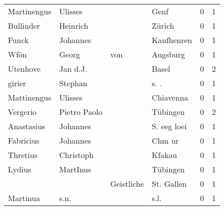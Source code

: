\begin{center}
\begin{tiny}
\begin{longtabu}{llllrr}
              Martinengus &                            Ulisses &             &                                        Genf &          0 &         1 \\
                Bullinder &                           Heinrich &             &                                      Zürich &          0 &         1 \\
                    Funck &                           Johannes &             &                                  Kaufhenren &          0 &         1 \\
                     Wfön &                              Georg &         von &                                    Augsburg &          0 &         1 \\
                 Utenhove &                           Jan d.J. &             &                                       Basel &          0 &         2 \\
                   girier &                            Stephan &             &                                       s. .  &          0 &         1 \\
              Mattinengus &                            Ulisses &             &                                   Chiavenna &          0 &         1 \\
                 Vergerio &                       Pietro Paolo &             &                                    Tübingen &          0 &         2 \\
               Anastasius &                           Johannes &             &                                 S. eeg loei &          0 &         1 \\
                Fabricius &                           Johannes &             &                                      Chm ur &          0 &         1 \\
                 Thretius &                          Christoph &             &                                      Kfakau &          0 &         1 \\
                   Lydius &                           MartInus &             &                                    Tübingen &          0 &         1 \\
                          &                                    &  Geistliche &                                  St. Gallen &          0 &         1 \\
                 Martinua &                               s.n. &             &                                        s.l. &          0 &         1 \\

\end{longtabu}
\end{tiny}
\end{center}
